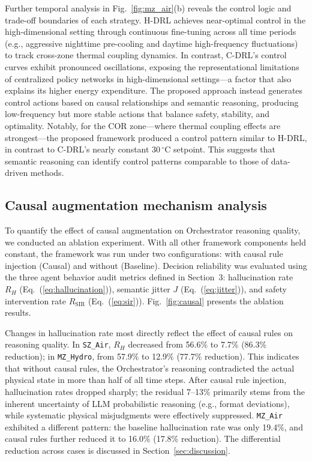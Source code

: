 \documentclass[a4paper]{cas-sc}
\begin{document}
Further temporal analysis in Fig.~\ref{fig:mz_air}(b) reveals the control logic and trade-off boundaries of each strategy. H-DRL achieves near-optimal control in the high-dimensional setting through continuous fine-tuning across all time periods (e.g., aggressive nighttime pre-cooling and daytime high-frequency fluctuations) to track cross-zone thermal coupling dynamics. In contrast, C-DRL's control curves exhibit pronounced oscillations, exposing the representational limitations of centralized policy networks in high-dimensional settings---a factor that also explains its higher energy expenditure. The proposed approach instead generates control actions based on causal relationships and semantic reasoning, producing low-frequency but more stable actions that balance safety, stability, and optimality. Notably, for the COR zone---where thermal coupling effects are strongest---the proposed framework produced a control pattern similar to H-DRL, in contrast to C-DRL's nearly constant 30\,$^{\circ}$C setpoint. This suggests that semantic reasoning can identify control patterns comparable to those of data-driven methods.


\subsection{Causal augmentation mechanism analysis}

To quantify the effect of causal augmentation on Orchestrator reasoning quality, we conducted an ablation experiment. With all other framework components held constant, the framework was run under two configurations: with causal rule injection (Causal) and without (Baseline). Decision reliability was evaluated using the three agent behavior audit metrics defined in Section~3: hallucination rate $R_H$ (Eq.~(\ref{eq:hallucination})), semantic jitter $J$ (Eq.~(\ref{eq:jitter})), and safety intervention rate $R_{\text{SIR}}$ (Eq.~(\ref{eq:sir})). Fig.~\ref{fig:causal} presents the ablation results.


Changes in hallucination rate most directly reflect the effect of causal rules on reasoning quality. In \texttt{SZ\_Air}, $R_H$ decreased from 56.6\% to 7.7\% (86.3\% reduction); in \texttt{MZ\_Hydro}, from 57.9\% to 12.9\% (77.7\% reduction). This indicates that without causal rules, the Orchestrator's reasoning contradicted the actual physical state in more than half of all time steps. After causal rule injection, hallucination rates dropped sharply; the residual 7--13\% primarily stems from the inherent uncertainty of LLM probabilistic reasoning (e.g., format deviations), while systematic physical misjudgments were effectively suppressed. \texttt{MZ\_Air} exhibited a different pattern: the baseline hallucination rate was only 19.4\%, and causal rules further reduced it to 16.0\% (17.8\% reduction). The differential reduction across cases is discussed in Section~\ref{sec:discussion}.
\end{document}
